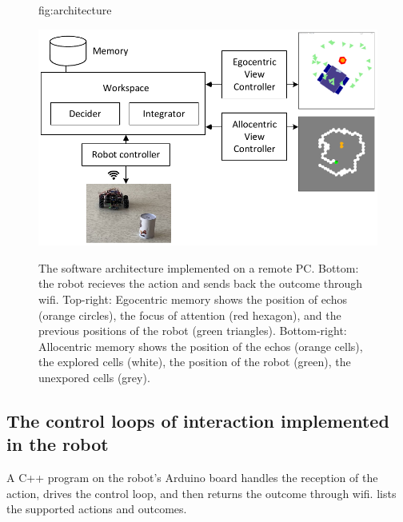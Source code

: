 \documentclass[pmlr]{jmlr}%
\begin{document}
\begin{figure}[htbp]
	\floatconts
	{fig:architecture}
	{\caption{The software architecture implemented on a remote PC. 
			Bottom: the robot recieves the action and sends back the outcome through wifi.
			Top-right: Egocentric memory shows the position of echos (orange circles), the focus of attention (red hexagon), and the previous positions of the robot (green triangles).
			Bottom-right: Allocentric memory shows the position of the echos (orange cells), the explored cells (white), the position of the robot (green), the unexpored cells (grey).}}
	{\includegraphics[width=0.7\linewidth]{images/Figure_2_Architecture}}
\end{figure}


\subsection{The control loops of interaction implemented in the robot}

A C++ program on the robot's Arduino board handles the reception of the action, drives the control loop, and then returns the outcome through wifi. 
 lists the supported actions and outcomes.
\end{document}
